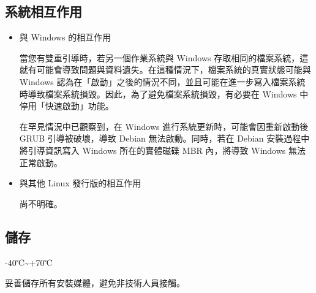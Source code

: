 \documentclass[UTF8]{article}
\begin{document}
\begin{multicols*}{3}


	 
	 


	\begin{tcolorbox}
	\section*{系統相互作用}
	\end{tcolorbox}
	\begin{itemize}[leftmargin=*]
		\setlength{\parindent}{0pt}

		\item 與 Windows 的相互作用

		當您有雙重引導時，若另一個作業系統與 Windows 存取相同的檔案系統，這就有可能會導致問題與資料遺失。在這種情況下，檔案系統的真實狀態可能與 Windows 認為在「啟動」之後的情況不同，並且可能在進一步寫入檔案系統時導致檔案系統損毀。因此，為了避免檔案系統損毀，有必要在 Windows 中停用「快速啟動」功能。

		在罕見情況中已觀察到，在 Windows 進行系統更新時，可能會因重新啟動後 GRUB 引導被破壞，導致 Debian 無法啟動。同時，若在 Debian 安裝過程中將引導資訊寫入 Windows 所在的實體磁碟 MBR 內，將導致 Windows 無法正常啟動。

		\item 與其他 Linux 發行版的相互作用

		尚不明確。

	\end{itemize}


	\begin{tcolorbox}
	\section*{儲存}
	\end{tcolorbox}

	-40℃\textasciitilde +70℃

	妥善儲存所有安裝媒體，避免非技術人員接觸。


\end{multicols*}
\end{document}
